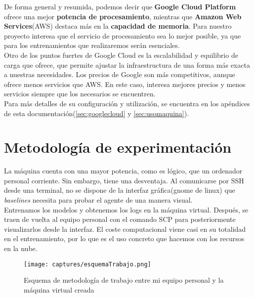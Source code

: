 \documentclass[11pt,fleqn]{book} %
\begin{document}
De forma general y resumida, podemos decir que \textbf{Google Cloud Platform} ofrece una mejor \textbf{potencia de procesamiento}, mientras que \textbf{Amazon Web Services}(AWS) destaca más en la \textbf{capacidad de memoria}. Para nuestro proyecto interesa que el servicio de procesamiento sea lo mejor posible, ya que para los entrenamientos que realizaremos serán esenciales. \\

Otro de los puntos fuertes de Google Cloud es la escalabilidad y equilibrio de carga que ofrece, que permite ajustar la infraestructura de una forma más exacta a nuestras necesidades. Los precios de Google son más competitivos, aunque ofrece menos servicios que AWS. En este caso, interesa mejores precios y menos servicios siempre que los necesarios se encuentren. \\

Para más detalles de su configuración y utilización, se encuentra en los apéndices de esta documentación(\ref{sec:googlecloud} y \ref{sec:usomaquina}).

\section{Metodología de experimentación}

La máquina cuenta con una mayor potencia, como es lógico, que un ordenador personal corriente. Sin embargo, tiene una desventaja. Al comunicarse por SSH desde una terminal, no se dispone de la interfaz gráfica(gnome de linux) que \textit{baselines} necesita para probar el agente de una manera visual. \\

Entrenamos los modelos y obtenemos los logs en la máquina virtual. Después, se traen de vuelta al equipo personal con el comando SCP para posteriormente visualizarlos desde la interfaz. El coste computacional viene casi en su totalidad en el entrenamiento, por lo que es el uso concreto que hacemos con los recursos en la nube.

\begin{figure}[H]
	\centering\texttt{[image: captures/esquemaTrabajo.png]}
	\caption{Esquema de metodología de trabajo entre mi equipo personal y la máquina virtual creada}
	\label{fig:formaTrabajo} %
\end{figure} 
\end{document}
